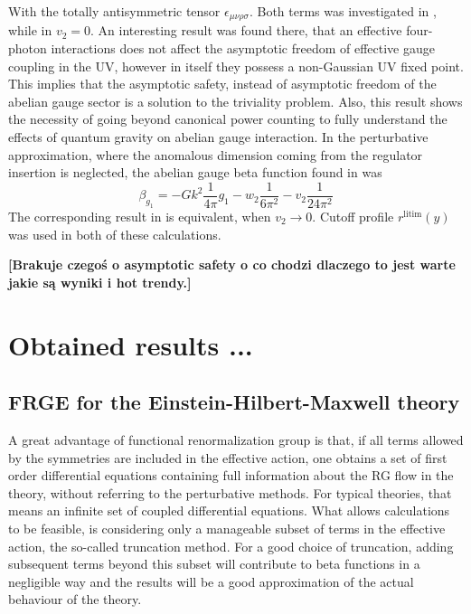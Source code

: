 \documentclass[11pt, a4paper]{article}
\newcommand{\jhkbf}[1]{\textbf{\color{red} [#1]}}
\begin{document}
With the totally antisymmetric tensor $\epsilon_{\mu\nu\rho\sigma}$.
Both terms was investigated in \cite{kwapisz_eichhorn}, while in \cite{christiansen_eichhorn} $v_2 = 0$.
An interesting result was found there, that an effective four-photon interactions does not affect the asymptotic freedom of effective gauge coupling
in the UV, however in itself they possess a non-Gaussian UV fixed point. This implies that the asymptotic safety, instead of asymptotic freedom
of the abelian gauge sector is a solution to the triviality problem. Also, this result shows
the necessity of going beyond canonical power counting to fully understand the effects of quantum gravity on abelian gauge interaction.
In the perturbative approximation, where the anomalous dimension coming from the regulator insertion is neglected,
the abelian gauge beta function found in \cite{kwapisz_eichhorn} was
\begin{equation}
    \beta_{g_1} = - Gk^2 \frac{1}{4\pi} g_1 - w_2 \frac{1}{6\pi^2} - v_2 \frac{1}{24\pi^2}
\end{equation}
The corresponding result in \cite{christiansen_eichhorn} is equivalent, when $v_2 \rightarrow 0$.
Cutoff profile $r^{\text{litim}}(y)$ was used in both of these calculations.

\jhkbf{Brakuje czegoś o asymptotic safety o co chodzi dlaczego to jest warte jakie są wyniki i hot trendy.}

\section{Obtained results ...}

\subsection{FRGE for the Einstein-Hilbert-Maxwell theory}

A great advantage of functional renormalization group is that, if all terms
allowed by the symmetries are included in the effective action, one obtains a set of first order
differential equations containing full information about the RG flow in the theory, without referring to the perturbative methods.
For typical theories, that means an infinite set of coupled differential equations.
What allows calculations to be feasible, is considering only a manageable subset of terms in the effective action, the so-called truncation method.
For a good choice of truncation, adding subsequent terms beyond this subset will contribute to beta functions in a negligible way
and the results will be a good approximation of the actual behaviour of the theory.
\end{document}
